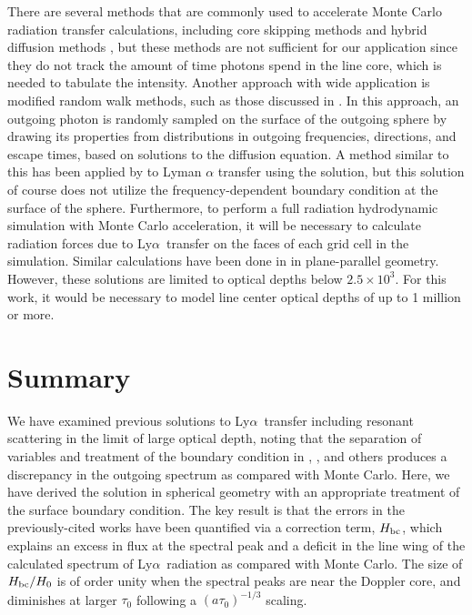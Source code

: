 \documentclass[linenumbers]{aastex63}
\newcommand\lya{Ly$\alpha$\ }
\begin{document}
There are several methods that are commonly used to accelerate Monte Carlo radiation transfer calculations, including core skipping methods \citep{1968ApJ...153..783A,2002ApJ...567..922A} and hybrid diffusion methods \citep{2018MNRAS.479.2065S}, but these methods are not sufficient for our application since they do not track the amount of time photons spend in the line core, which is needed to tabulate the intensity. Another approach with wide application is modified random walk methods, such as those discussed in \citet{1984JCoPh..54..508F, 2009A&A...497..155M, 2010A&A...520A..70R}. In this approach, an outgoing photon is randomly sampled on the surface of the outgoing sphere by drawing its properties from distributions in outgoing frequencies, directions, and escape times, based on solutions to the diffusion equation. A method similar to this has been applied by \citet{2006ApJ...645..792T} to Lyman $\alpha$ transfer using the \citet{1990ApJ...350..216N} solution, but this solution of course does not utilize the frequency-dependent boundary condition at the surface of the sphere. Furthermore, to perform a full radiation hydrodynamic simulation with Monte Carlo acceleration, it will be necessary to calculate radiation forces due to \lya transfer on the faces of each grid cell in the simulation. Similar calculations have been done in \citet{1976ApJ...208..286W} in plane-parallel geometry. However, these solutions are limited to optical depths below $2.5 \times 10^3$. For this work, it would be necessary to model line center optical depths of up to 1 million or more.

\section{Summary}

We have examined previous solutions to \lya transfer including resonant scattering in the limit of large optical depth, noting that the separation of variables and treatment of the boundary condition in \citet{1973MNRAS.162...43H}, \citet{1990ApJ...350..216N}, \citet{2006ApJ...649...14D} and others produces a discrepancy in the outgoing spectrum as compared with Monte Carlo. Here, we have derived the solution in spherical geometry with an appropriate treatment of the surface boundary condition. The key result is that the errors in the previously-cited works have been quantified via a correction term, $H_{\rm bc}$, which explains an excess in flux at the spectral peak and a deficit in the line wing of the calculated spectrum of \lya radiation as compared with Monte Carlo. The size of $H_{\rm bc}/H_0$ is of order unity when the spectral peaks are near the Doppler core, and diminishes at larger $\tau_0$ following a $(a\tau_0)^{-1/3}$ scaling. 
\end{document}
